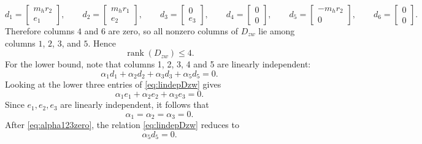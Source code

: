 \documentclass[11pt]{article}
\newcommand{\rank}{\operatorname{rank}}
\begin{document}
\begin{equation}
    d_1 =
    \begin{bmatrix}
        m_h r_2 \\ e_1
    \end{bmatrix},
    \qquad
    d_2 =
    \begin{bmatrix}
        m_h r_1 \\ e_2
    \end{bmatrix},
    \qquad
    d_3 =
    \begin{bmatrix}
        0 \\ e_3
    \end{bmatrix},
    \qquad
    d_4 =
    \begin{bmatrix}
        0 \\ 0
    \end{bmatrix},
    \qquad
    d_5 =
    \begin{bmatrix}
        -m_h r_2 \\ 0
    \end{bmatrix},
    \qquad
    d_6 =
    \begin{bmatrix}
        0 \\ 0
    \end{bmatrix}.
    \label{eq:Dzwcolumns}
\end{equation}
Therefore columns $4$ and $6$ are zero, so all nonzero columns of $D_{zw}$
lie among columns $1$, $2$, $3$, and $5$. Hence
\begin{equation}
    \rank(D_{zw}) \leq 4.
    \label{eq:rankDzwUpper}
\end{equation}
For the lower bound, note that columns 1, 2, 3, 4 and 5 are linearly independent:
\begin{equation}
    \alpha_1 d_1 + \alpha_2 d_2 + \alpha_3 d_3 + \alpha_5 d_5 = 0.
    \label{eq:lindepDzw}
\end{equation}
Looking at the lower three entries of \eqref{eq:lindepDzw} gives
\begin{equation}
    \alpha_1 e_1 + \alpha_2 e_2 + \alpha_3 e_3 = 0.
    \label{eq:lowerblock}
\end{equation}
Since $e_1,e_2,e_3$ are linearly independent, it follows that
\begin{equation}
    \alpha_1 = \alpha_2 = \alpha_3 = 0.
    \label{eq:alpha123zero}
\end{equation}
After \eqref{eq:alpha123zero}, the relation \eqref{eq:lindepDzw} reduces to
\begin{equation}
    \alpha_5 d_5 = 0.
\end{equation}
\end{document}
